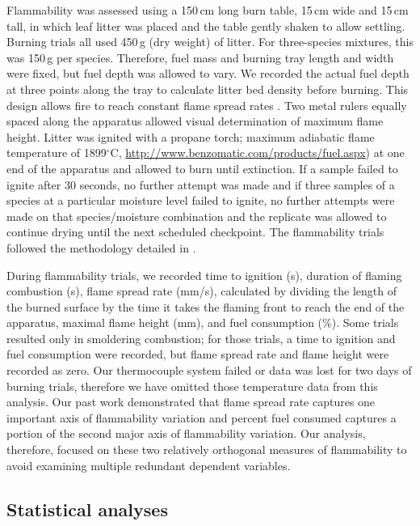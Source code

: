 \documentclass[letterpaper,12pt]{article}
\begin{document}
Flammability was assessed using a 150\,cm long burn table, 15\,cm wide and
15\,cm tall, in which leaf litter was placed and the table gently shaken to
allow settling. Burning trials all used 450\,g (dry weight) of litter. For
three-species mixtures, this was 150\,g per species. Therefore, fuel mass and
burning tray length and width were fixed, but fuel depth was allowed to vary.
We recorded the actual fuel depth at three points along the tray to calculate
litter bed density before burning. This design allows fire to reach constant
flame spread rates \citep{Magalhaes+Schwilk-2012}. Two metal rulers equally
spaced along the apparatus allowed visual determination of maximum flame
height. Litter was ignited with a propane torch; maximum adiabatic flame
temperature of 1899$^\circ$C,
\url{http://www.benzomatic.com/products/fuel.aspx}) at one end of the apparatus
and allowed to burn until extinction. If a sample failed to ignite after 30
seconds, no further attempt was made and if three samples of a species at a
particular moisture level failed to ignite, no further attempts were made on
that species/moisture combination and the replicate was allowed to continue
drying until the next scheduled checkpoint. The flammability trials followed
the methodology detailed in \citet{Magalhaes+Schwilk-2012}.
 
During flammability trials, we recorded time to ignition (s), duration of
flaming combustion (s), flame spread rate (mm/s), calculated by dividing the
length of the burned surface by the time it takes the flaming front to reach
the end of the apparatus, maximal flame height (mm), and fuel consumption (\%).
Some trials resulted only in smoldering combustion; for those trials, a time to
ignition and fuel consumption were recorded, but flame spread rate and flame
height were recorded as zero. Our thermocouple system failed or data was lost
for two days of burning trials, therefore we have omitted those temperature
data from this analysis. Our past work \citep{Magalhaes+Schwilk-2012}
demonstrated that flame spread rate captures one important axis of flammability
variation \citep{Schwilk-2015, Pausas+Keeley+etal-2017, Prior+Murphy+etal-2018}
and percent fuel consumed captures a portion of the second major axis of
flammability variation. Our analysis, therefore, focused on these two
relatively orthogonal measures of flammability to avoid examining multiple
redundant dependent variables.


\subsection*{Statistical analyses}
\end{document}
